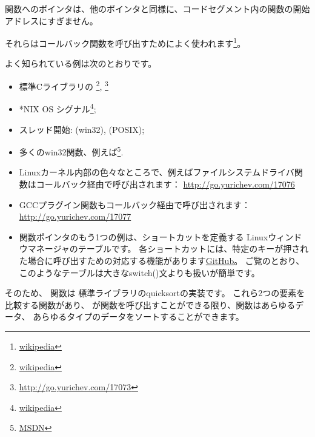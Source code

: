 ﻿\newcommand{\comp}{\TT{comp()}\xspace}
\label{sec:pointerstofunctions}

\myindex{\CLanguageElements!\Pointers}

関数へのポインタは、他のポインタと同様に、コードセグメント内の関数の開始アドレスにすぎません。

それらはコールバック関数を呼び出すためによく使われます\footnote{\href{http://go.yurichev.com/17071}{wikipedia}}。

よく知られている例は次のとおりです。

\begin{itemize}
\item 標準Cライブラリの \qsort\footnote{\href{http://go.yurichev.com/17072}{wikipedia}},
{}\footnote{\url{http://go.yurichev.com/17073}}

\item *NIX OS シグナル\footnote{\href{http://go.yurichev.com/17074}{wikipedia}};

\item スレッド開始:  (win32),  (POSIX);

\item 多くのwin32関数、例えば\footnote{\href{http://go.yurichev.com/17075}{MSDN}}.

\item Linuxカーネル内部の色々なところで、例えばファイルシステムドライバ関数はコールバック経由で呼び出されます：
\url{http://go.yurichev.com/17076}

\item GCCプラグイン関数もコールバック経由で呼び出されます：
\url{http://go.yurichev.com/17077}

\item 関数ポインタのもう1つの例は、ショートカットを定義する Linuxウィンドウマネージャのテーブルです。 
各ショートカットには、特定のキーが押された場合に呼び出すための対応する機能があります\href{http://go.yurichev.com/17078}{GitHub}。
ご覧のとおり、このようなテーブルは大きなswitch()文よりも扱いが簡単です。
\end{itemize}


そのため、 \qsort 関数は \CCpp 標準ライブラリのquicksortの実装です。 
これら2つの要素を比較する関数があり、 \qsort が関数を呼び出すことができる限り、関数はあらゆるデータ、
あらゆるタイプのデータをソートすることができます。

